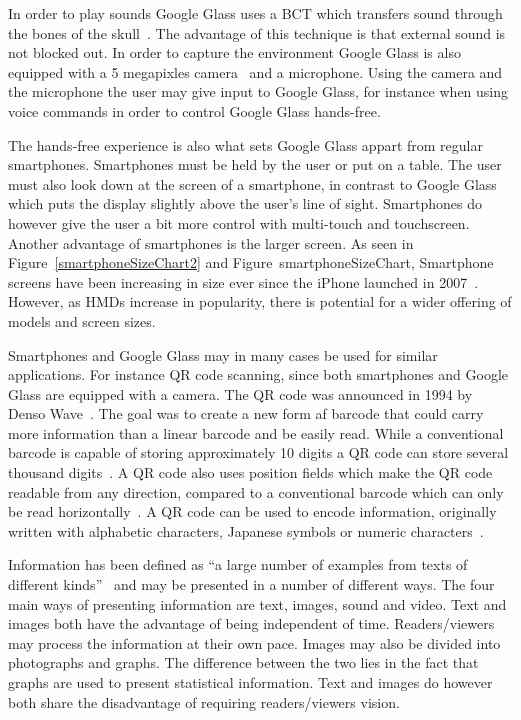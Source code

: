 In order to play sounds Google Glass uses a BCT which transfers sound through the bones of the skull~\cite{GlassSpecs}. The advantage of this technique is that external sound is not blocked out. In order to capture the environment Google Glass is also equipped with a 5 megapixles camera~\cite{GlassSpecs} and a microphone. Using the camera and the microphone the user may give input to Google Glass, for instance when using voice commands in order to control Google Glass hands-free.

The hands-free experience is also what sets Google Glass appart from regular smartphones. Smartphones must be held by the user or put on a table. The user must also look down at the screen of a smartphone, in contrast to Google Glass which puts the display slightly above the user's line of sight. Smartphones do however give the user a bit more control with multi-touch and touchscreen. Another advantage of smartphones is the larger screen. As seen in Figure~\ref{smartphoneSizeChart2} and Figure~{smartphoneSizeChart}, Smartphone screens have been increasing in size ever since the iPhone launched in 2007~\cite{smartphoneSizeChart2}. However, as HMDs increase in popularity, there is potential for a wider offering of models and screen sizes.

Smartphones and Google Glass may in many cases be used for similar applications. For instance QR code scanning, since both smartphones and Google Glass are equipped with a camera. The QR code was announced in 1994 by Denso Wave~\cite{qrCodeHistory}. The goal was to create a new form af barcode that could carry more information than a linear barcode and be easily read. While a conventional barcode is capable of storing approximately 10 digits a QR code can store several thousand digits~\cite{qrCodeType}. A QR code also uses position fields which make the QR code readable from any direction, compared to a conventional barcode which can only be read horizontally~\cite{qrCodeAbout}. A QR code can be used to encode information, originally written with alphabetic characters, Japanese symbols or numeric characters~\cite{qrCodeVersion}. 

Information has been defined as ``a large number of examples from texts of different kinds''~\cite{informationDef1} and may be presented in a number of different ways. The four main ways of presenting information are text, images, sound and video. Text and images both have the advantage of being independent of time. Readers/viewers may process the information at their own pace. Images may also be divided into photographs and graphs. The difference between the two lies in the fact that graphs are used to present statistical information. Text and images do however both share the disadvantage of requiring readers/viewers vision.

